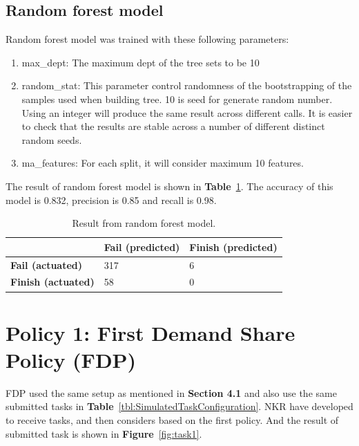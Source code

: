 \documentclass[12pt,oneside,openright,a4paper]{cpe-english-project}
\begin{document}
\subsection{Random forest model}  
\hspace{10mm}Random forest model was trained with these following parameters: 
\begin{enumerate}
  \item max\_dept: The maximum dept of the tree sets to be 10
  \item random\_stat: This parameter control randomness of the bootstrapping of the samples used when building tree. 10 is seed for generate random number. Using an integer will produce the same result across different calls. It is easier to check that the results are stable across a number of different distinct random seeds.
  \item ma\_features: For each split, it will consider maximum 10 features.
\end{enumerate}
\hspace{10mm}The result of random forest model is shown in \textbf{Table}~\ref{tbl:RandomForestConfusion}. The accuracy of this model is 0.832, precision is 0.85 and recall is 0.98.

\begin{table}[!h]
  \caption{Result from random forest model.}\label{tbl:RandomForestConfusion}
  \begin{tabular}{@{}|p{}|p{}|p{}|}
   \hline
   \textbf{} & \textbf{Fail (predicted)} & \textbf{Finish (predicted)} \\ 
   \hline
   \textbf{Fail (actuated)} & 317 & 6 \\ 
   \hline
   \textbf{Finish (actuated)} & 58 & 0 \\ 
   \hline                     
  \end{tabular}
\end{table}

\section{Policy 1: First Demand Share Policy (FDP)}  
\hspace{10mm}FDP used the same setup as mentioned in \textbf{Section 4.1} and also use the same submitted tasks in \textbf{Table}~\ref{tbl:SimulatedTaskConfiguration}. NKR have developed to receive tasks, and then considers based on the first policy. And the result of submitted task is shown in \textbf{Figure}~\ref{fig:task1}.
\end{document}
